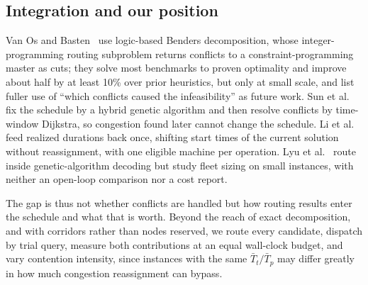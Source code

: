 \subsection{Integration and our position}

Van Os and Basten~\cite{vanos2026exact} use logic-based Benders decomposition, whose integer-programming routing subproblem returns conflicts to a constraint-programming master as cuts; they solve most benchmarks to proven optimality and improve about half by at least 10\% over prior heuristics, but only at small scale, and list fuller use of ``which conflicts caused the infeasibility'' as future work.
Sun et al.~\cite{sun2023integrated} fix the schedule by a hybrid genetic algorithm and then resolve conflicts by time-window Dijkstra, so congestion found later cannot change the schedule.
Li et al.~\cite{li2026framework} feed realized durations back once, shifting start times of the current solution without reassignment, with one eligible machine per operation.
Lyu et al.~\cite{lyu2019approach} route inside genetic-algorithm decoding but study fleet sizing on small instances, with neither an open-loop comparison nor a cost report.

The gap is thus not whether conflicts are handled but how routing results enter the schedule and what that is worth.
Beyond the reach of exact decomposition, and with corridors rather than nodes reserved, we route every candidate, dispatch by trial query, measure both contributions at an equal wall-clock budget, and vary contention intensity, since instances with the same $\bar{T}_t/\bar{T}_p$ may differ greatly in how much congestion reassignment can bypass.

